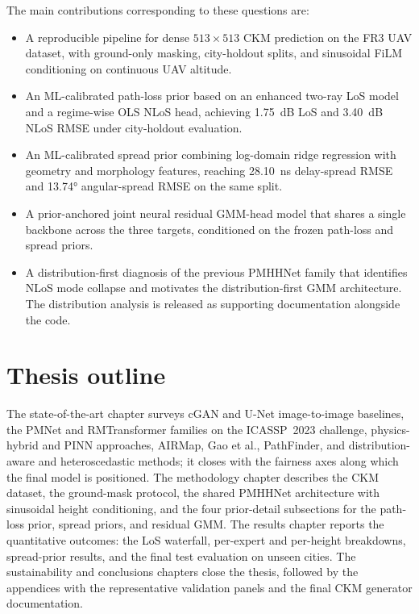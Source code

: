 The main contributions corresponding to these questions are:

\begin{itemize}
  \item A reproducible pipeline for dense \(513\times513\) CKM prediction on
        the FR3 UAV dataset, with ground-only masking, city-holdout splits,
        and sinusoidal FiLM conditioning on continuous UAV altitude.
  \item An ML-calibrated path-loss prior based on an
        enhanced two-ray LoS model and a regime-wise OLS NLoS head,
        achieving \SI{1.75}{dB} LoS and \SI{3.40}{dB} NLoS RMSE under
        city-holdout evaluation.
  \item An ML-calibrated spread prior combining
        log-domain ridge regression with geometry and morphology features,
        reaching \SI{28.10}{ns} delay-spread RMSE and
        \ang{13.74} angular-spread RMSE on the same split.
  \item A prior-anchored joint neural residual GMM-head model that shares
        a single backbone across the three targets, conditioned on the frozen
        path-loss and spread priors.
  \item A distribution-first diagnosis of the previous PMHHNet family
        that identifies NLoS mode collapse and motivates the
        distribution-first GMM architecture. The distribution analysis is released as
        supporting documentation alongside the code.
\end{itemize}

\section{Thesis outline}

The state-of-the-art chapter surveys cGAN and U-Net image-to-image baselines,
the PMNet and RMTransformer families on the ICASSP~2023 challenge,
physics-hybrid and PINN approaches, AIRMap, Gao et al., PathFinder, and
distribution-aware and heteroscedastic methods; it closes with the fairness
axes along which the final model is positioned. The methodology chapter describes the
CKM dataset, the ground-mask protocol, the shared
PMHHNet architecture with sinusoidal height conditioning, and the four
prior-detail subsections for the path-loss prior, spread priors, and residual
GMM. The results chapter reports the quantitative outcomes: the LoS waterfall,
per-expert and per-height breakdowns, spread-prior results, and the final test evaluation on
unseen cities. The sustainability and conclusions chapters close the thesis,
followed by the appendices with the representative validation panels and the final
CKM generator documentation.

